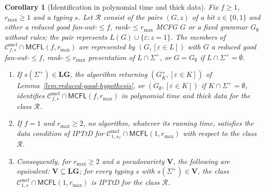\documentclass[11pt]{article}
\numberwithin{equation}{section}
\theoremstyle{plain}
\newtheorem{corollary}[theorem]{Corollary}
\theoremstyle{definition}
\theoremstyle{remark}
\newcommand{\Cmcf}[2]{\mathcal{C}^{\mathrm{mcf}}_{#1,#2}}
\newcommand{\eps}{\varepsilon}
\theoremstyle{plain}
\begin{document}
\begin{corollary}[Identification in polynomial time and thick data]
\label{cor:iptd}
Fix $f\ge1$, $r_{\max}\ge1$ and a typing $s$.  Let $\mathcal R$ consist of the
pairs $(G,z)$ of a bit $z\in\{0,1\}$ and either a reduced good fan-out-$\le f$,
rank-$\le r_{\max}$ MCFG $G$ or a fixed grammar $G_\emptyset$ without rules; the pair
represents $L(G)\cup\{\eps:z=1\}$.  The members of
$\Cmcf{f}{s}\cap\mathsf{MCFL}(f,r_{\max})$ are represented by
$(G,[\eps\in L])$ with $G$ a reduced good fan-out-$\le f$, rank-$\le r_{\max}$
presentation of $L\cap\Sigma^+$, or $G=G_\emptyset$ if $L\cap\Sigma^+=\emptyset$.
\begin{enumerate}[label=\textup{(\roman*)},leftmargin=*]
\item If $s(\Sigma^+)\in\mathbf{LG}$, the algorithm returning
$(G^+_K,[\eps\in K])$ of Lemma~\ref{lem:reduced-good-hypothesis}, or
$(G_\emptyset,[\eps\in K])$ if $K\cap\Sigma^+=\emptyset$, identifies
$\Cmcf{f}{s}\cap\mathsf{MCFL}(f,r_{\max})$ in polynomial time and thick data for
the class $\mathcal R$.
\item If $f=1$ and $r_{\max}\ge2$, no algorithm, whatever its running
time, satisfies the data condition of IPTtD for
$\Cmcf{1}{s_U}\cap\mathsf{MCFL}(1,r_{\max})$ with respect to the class
$\mathcal R$.
\item Consequently, for $r_{\max}\ge2$ and a pseudovariety $\mathbf V$, the
following are equivalent: $\mathbf V\subseteq\mathbf{LG}$; for every typing $s$
with $s(\Sigma^+)\in\mathbf V$, the class
$\Cmcf{1}{s}\cap\mathsf{MCFL}(1,r_{\max})$ is IPTtD for the class $\mathcal R$.
\end{enumerate}
\end{corollary}
\end{document}
